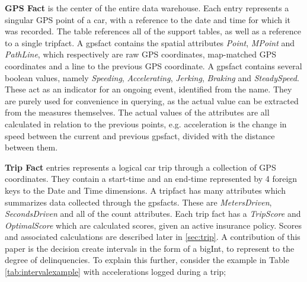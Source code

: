 \textbf{GPS Fact} is the center of the entire data warehouse. Each entry represents a singular GPS point of a car, with a reference to the date and time for which it was recorded. The table references all of the support tables, as well as a reference to a single tripfact. A gpsfact contains the spatial attributes \textit{Point}, \textit{MPoint} and \textit{PathLine}, which respectively are raw GPS coordinates, map-matched GPS coordinates and a line to the previous GPS coordinate. A gpsfact contains several boolean values, namely \textit{Speeding}, \textit{Accelerating}, \textit{Jerking}, \textit{Braking} and \textit{SteadySpeed}. These act as an indicator for an ongoing event, identified from the name. They are purely used for convenience in querying, as the actual value can be extracted from the measures themselves. The actual values of the attributes are all calculated in relation to the previous points, e.g. acceleration is the change in speed between the current and previous gpsfact, divided with the distance between them.

\textbf{Trip Fact} entries represents a logical car trip through a collection of GPS coordinates. They contain a start-time and an end-time represented by 4 foreign keys to the Date and Time dimensions. A tripfact has many attributes which summarizes data collected through the gpsfacts. These are \textit{MetersDriven}, \textit{SecondsDriven} and all of the count attributes. Each trip fact has a \textit{TripScore} and \textit{OptimalScore} which are calculated scores, given an active insurance policy. Scores and associated calculations are described later in \ref{sec:trip}. A contribution of this paper is the decision create intervals in the form of a bigInt, to represent to the degree of delinquencies. To explain this further, consider the example in Table \ref{tab:intervalexample} with accelerations logged during a trip; 

